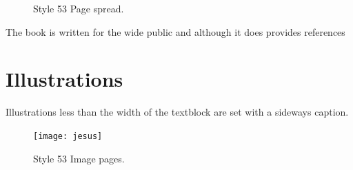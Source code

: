 \begin{figure}[ht]
\caption{Style 53 Page spread.}
\end{figure}

The book is written for the wide public and although it does provides references 
\lipsum

\section{Illustrations}

Illustrations less than the width of the textblock are set with a sideways caption.

\begin{figure}[ht]
\texttt{[image: jesus]}
\caption{Style 53 Image pages.}
\end{figure}
\lipsum[1-4]






